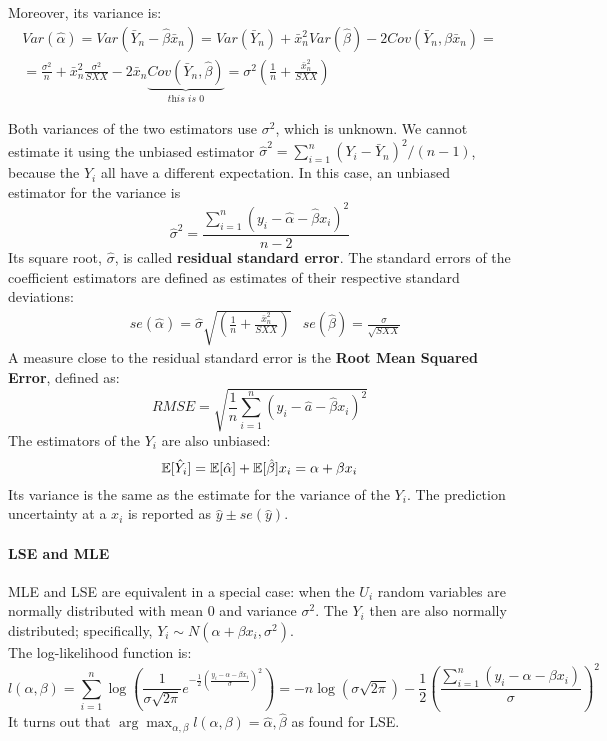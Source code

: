 Moreover, its variance is:
\begin{gather*}
    Var(\hat{\alpha}) = Var(\bar{Y}_n - \hat{\beta} \bar{x}_n) = Var(\bar{Y}_n) + \bar{x}_n^2 Var(\hat{\beta}) - 2 Cov(\bar{Y}_n, \beta \bar{x}_n) = \\
    = \frac{\sigma^2}{n} + \bar{x}_n^2 \frac{\sigma^2}{SXX} - 2 \bar{x}_n \underset{\textit{this is 0}}{\underbrace{Cov(\bar{Y}_n, \hat{\beta})}} = \sigma^2 \left( \frac{1}{n} + \frac{\bar{x}_n^2}{SXX}\right)
\end{gather*}

Both variances of the two estimators use $\sigma^2$, which is unknown. We cannot estimate it using the unbiased estimator $\hat{\sigma}^2 = \sum_{i=1}^n (Y_i - \bar{Y}_n)^2/(n-1)$, because the $Y_i$ all have a different expectation. In this case, an unbiased estimator for the variance is
\begin{equation*}
    \hat{\sigma}^2 = \frac{\sum_{i=1}^n (y_i - \hat{\alpha} - \hat{\beta} x_i)^2}{n-2}
\end{equation*}   
Its square root, $\hat{\sigma}$, is called \textbf{residual standard error}. The standard errors of the coefficient estimators are defined as estimates of their respective standard deviations:
\begin{align*}
    &se(\hat{\alpha}) = \hat{\sigma} \sqrt{\left( \frac{1}{n} + \frac{\bar{x}_n^2}{SXX} \right)} &se(\hat{\beta}) = \frac{\sigma}{\sqrt{SXX}}
\end{align*}
A measure close to the residual standard error is the \textbf{Root Mean Squared Error}, defined as:
\begin{equation*}
    RMSE = \sqrt{\frac{1}{n} \sum_{i=1}^n (y_i - \hat{a} - \hat{\beta}x_i)^2}
\end{equation*}   
The estimators of the $Y_i$ are also unbiased:
\begin{equation*}
    \mathbb{E}[\hat{Y}_i] = \mathbb{E}[\hat{\alpha}] + \mathbb{E}[\hat{\beta}] x_i = \alpha + \beta x_i
\end{equation*}   
Its variance is the same as the estimate for the variance of the $Y_i$. The prediction uncertainty at a $x_i$ is reported as $\hat{y} \pm se(\hat{y})$.

\paragraph{LSE and MLE}
MLE and LSE are equivalent in a special case: when the $U_i$ random variables are normally distributed with mean 0 and variance $\sigma^2$. The $Y_i$ then are also normally distributed; specifically, $Y_i \sim N(\alpha + \beta x_i, \sigma^2)$. \\
The log-likelihood function is:
\begin{equation*}
    l(\alpha, \beta) = \sum_{i=1}^n \log \left( \frac{1}{\sigma \sqrt{2 \pi}} e^{-\frac{1}{2} \left(\frac{y_i - \alpha - \beta x_i}{\sigma}\right)^2}\right) = -n \log(\sigma \sqrt{2 \pi}) - \frac{1}{2} \left(\frac{\sum_{i=1}^n (y_i - \alpha - \beta x_i)}{\sigma}\right)^2
\end{equation*}   
It turns out that $\arg \max_{\alpha, \beta} l(\alpha, \beta) = \hat{\alpha}, \hat{\beta}$ as found for LSE.

